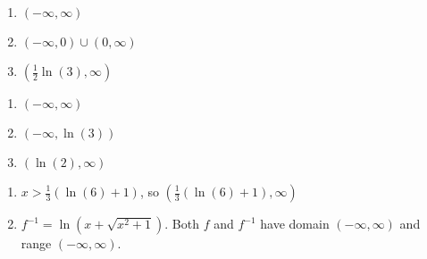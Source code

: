 \documentclass{ximera}
\begin{document}
\begin{multicols}{3} 
\begin{enumerate}
\setcounter{enumi}{\value{HW}}

\item  $(-\infty, \infty)$   
\item   $(-\infty, 0) \cup (0, \infty)$  
\item     $\left( \frac{1}{2} \ln(3), \infty \right)$

\setcounter{HW}{\value{enumi}}
\end{enumerate}
\end{multicols}


\begin{multicols}{3} 
\begin{enumerate}
\setcounter{enumi}{\value{HW}}


\item    $(-\infty, \infty)$  

\item     $(-\infty, \ln(3))$

\item    $(\ln(2), \infty) $  

\setcounter{HW}{\value{enumi}}
\end{enumerate}
\end{multicols}


\begin{enumerate}
\setcounter{enumi}{\value{HW}}


\item $x > \frac{1}{3}(\ln(6) + 1)$, so $\left(\frac{1}{3}(\ln(6) + 1), \infty \right)$ 

\item  $f^{-1} = \ln\left(x + \sqrt{x^{2} + 1}\right)$. Both $f$ and $f^{-1}$ have domain $(-\infty, \infty)$ and range $(-\infty, \infty)$.



\setcounter{HW}{\value{enumi}}
\end{enumerate}
\end{document}
